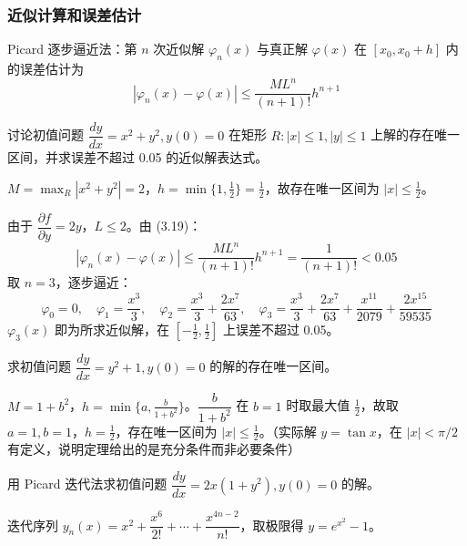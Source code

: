 \subsubsection{近似计算和误差估计}

Picard 逐步逼近法：第 $n$ 次近似解 $\varphi_n(x)$ 与真正解 $\varphi(x)$ 在 $[x_0, x_0+h]$ 内的误差估计为
\begin{equation}|\varphi_n(x) - \varphi(x)| \le \frac{ML^n}{(n+1)!}h^{n+1} \tag{3.19}\end{equation}

\begin{example}
讨论初值问题 $\dfrac{dy}{dx} = x^2 + y^2, y(0) = 0$ 在矩形 $R: |x| \le 1, |y| \le 1$ 上解的存在唯一区间，并求误差不超过 0.05 的近似解表达式。
\end{example}

\begin{solution}
$M = \max_R |x^2+y^2| = 2$，$h = \min\{1, \frac{1}{2}\} = \frac{1}{2}$，故存在唯一区间为 $|x| \le \frac{1}{2}$。

由于 $\dfrac{\partial f}{\partial y} = 2y$，$L \le 2$。由 (3.19)：
$$|\varphi_n(x) - \varphi(x)| \le \frac{ML^n}{(n+1)!}h^{n+1} = \frac{1}{(n+1)!} < 0.05$$
取 $n = 3$，逐步逼近：
$$\varphi_0 = 0, \quad \varphi_1 = \frac{x^3}{3}, \quad \varphi_2 = \frac{x^3}{3} + \frac{2x^7}{63}, \quad \varphi_3 = \frac{x^3}{3} + \frac{2x^7}{63} + \frac{x^{11}}{2079} + \frac{2x^{15}}{59535}$$
$\varphi_3(x)$ 即为所求近似解，在 $[-\frac{1}{2}, \frac{1}{2}]$ 上误差不超过 0.05。
\end{solution}

\begin{example}
求初值问题 $\dfrac{dy}{dx} = y^2 + 1, y(0) = 0$ 的解的存在唯一区间。
\end{example}

\begin{solution}
$M = 1 + b^2$，$h = \min\{a, \frac{b}{1+b^2}\}$。$\dfrac{b}{1+b^2}$ 在 $b = 1$ 时取最大值 $\frac{1}{2}$，故取 $a = 1, b = 1$，$h = \frac{1}{2}$，存在唯一区间为 $|x| \le \frac{1}{2}$。（实际解 $y = \tan x$，在 $|x| < \pi/2$ 有定义，说明定理给出的是充分条件而非必要条件）
\end{solution}

\begin{example}
用 Picard 迭代法求初值问题 $\dfrac{dy}{dx} = 2x(1 + y^2), y(0) = 0$ 的解。
\end{example}

\begin{solution}
迭代序列 $y_n(x) = x^2 + \dfrac{x^6}{2!} + \cdots + \dfrac{x^{4n-2}}{n!}$，取极限得 $y = e^{x^2} - 1$。
\end{solution}

